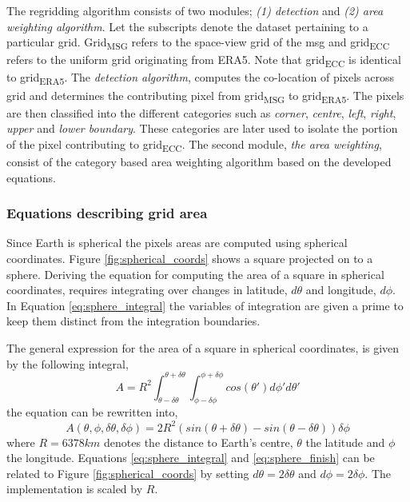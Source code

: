 The regridding algorithm consists of two modules; \textit{(1) detection} and \textit{(2) area weighting algorithm}. Let the subscripts denote the dataset pertaining to a particular grid. Grid\textsubscript{MSG} refers to the space-view grid of the \acrlong{msg} and grid\textsubscript{ECC} refers to the uniform grid originating from ERA5. Note that grid\textsubscript{ECC} is identical to  grid\textsubscript{ERA5}. The \textit{detection algorithm}, computes the co-location of pixels across grid and determines the contributing pixel from grid\textsubscript{MSG} to grid\textsubscript{ERA5}.
%
The pixels are then classified into the different categories such as \textit{corner}, \textit{centre}, \textit{left}, \textit{right}, \textit{upper} and \textit{lower boundary}. These categories are later used to isolate the portion of the pixel contributing to grid\textsubscript{ECC}.
The second module, \textit{the area weighting}, consist of the category based area weighting algorithm based on the developed equations.

\subsubsection{Equations describing grid area}
Since Earth is spherical the pixels areas are computed using spherical coordinates. Figure \ref{fig:spherical_coords} shows a square projected on to a sphere. Deriving the equation for computing the area of a square in spherical coordinates, requires integrating over changes in latitude, $d\theta$ and longitude, $d\phi$. In Equation \eqref{eq:sphere_integral} the variables of integration are given a prime to keep them distinct from the integration boundaries.

The general expression for the area of a square in spherical coordinates, is given by the following integral,
\begin{equation} \label{eq:sphere_integral}
    A = R^2\int_{ \theta - \delta \theta }^{\theta + \delta \theta} \int_{ \phi - \delta \phi }^{\phi + \delta \phi} cos\left( \theta' \right) d\phi' d\theta'
\end{equation}
the equation can be rewritten into,
\begin{equation} \label{eq:sphere_finish}
    A \left( \theta, \phi, \delta \theta, \delta \phi   \right)= 2R^2 \left( sin\left( \theta + \delta \theta  \right) - sin\left(  \theta - \delta \theta  \right) \right) \delta \phi
\end{equation}
where $R=6378km$ denotes the distance to Earth's centre, $\theta$ the latitude and $\phi$ the longitude. Equations \eqref{eq:sphere_integral} and \eqref{eq:sphere_finish} can be related to Figure \ref{fig:spherical_coords} by setting $d \theta = 2 \delta \theta$ and $d \phi = 2 \delta \phi$. The implementation is scaled by $R$.

